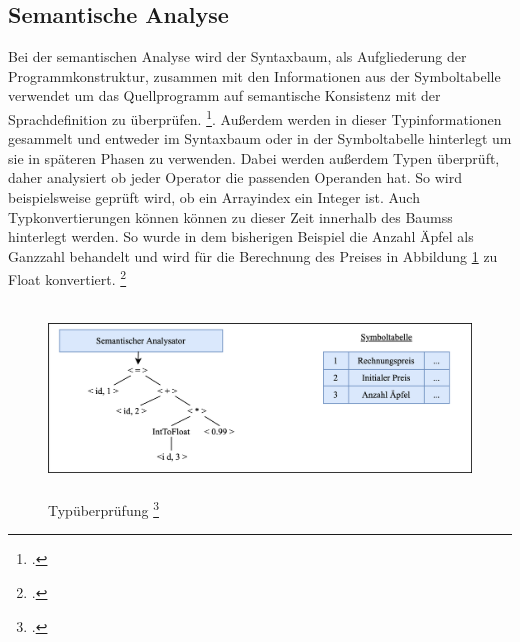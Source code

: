 \subsection{Semantische Analyse}

Bei der semantischen Analyse wird der Syntaxbaum,    als Aufgliederung der Programmkonstruktur,  zusammen mit den Informationen aus der Symboltabelle verwendet um das Quellprogramm auf semantische Konsistenz mit der Sprachdefinition zu überprüfen. \footcite[Vgl.][S. 157]{Wilhelm2012}.  Außerdem werden in dieser Typinformationen gesammelt und entweder im Syntaxbaum oder in der Symboltabelle hinterlegt um sie in späteren Phasen zu verwenden. Dabei werden außerdem Typen überprüft,  daher analysiert ob jeder Operator die passenden Operanden hat.  So wird beispielsweise geprüft wird, ob ein Arrayindex ein Integer ist. Auch Typkonvertierungen können können zu dieser Zeit innerhalb des Baumss hinterlegt werden.  So wurde in dem bisherigen Beispiel die Anzahl Äpfel als Ganzzahl behandelt und wird für die Berechnung des Preises in Abbildung \ref{fig:Typ} zu Float konvertiert. \footcite[Vgl.][S. 9ff]{Ullmann2008}

\begin{figure}[!ht]
 \includegraphics[width=14.5cm,height=5cm]{Images/Compiler/Type.png}
 \caption[Typüberprüfung]{Typüberprüfung \protect\footcite{Ullmann2008} }
 \label{fig:Typ}
\end{figure}
